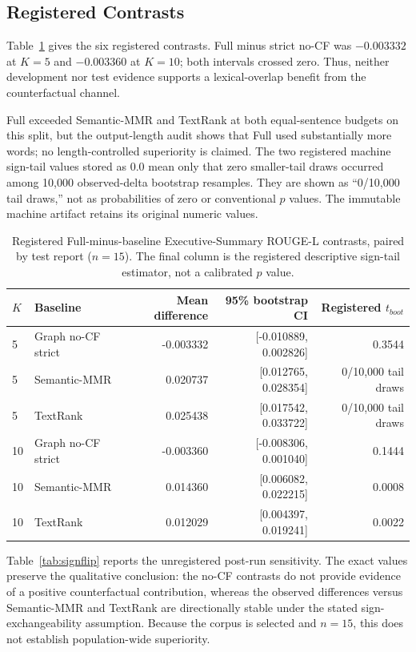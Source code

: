 \documentclass[applsci,article,submit,moreauthors]{Definitions/mdpi}
\begin{document}
\subsection{Registered Contrasts}

Table~\ref{tab:contrasts} gives the six registered contrasts. Full minus strict no-CF was $-0.003332$ at $K=5$ and $-0.003360$ at $K=10$; both intervals crossed zero. Thus, neither development nor test evidence supports a lexical-overlap benefit from the counterfactual channel.

Full exceeded Semantic-MMR and TextRank at both equal-sentence budgets on this split, but the output-length audit shows that Full used substantially more words; no length-controlled superiority is claimed. The two registered machine sign-tail values stored as 0.0 mean only that zero smaller-tail draws occurred among 10,000 observed-delta bootstrap resamples. They are shown as ``0/10,000 tail draws,'' not as probabilities of zero or conventional $p$ values. The immutable machine artifact retains its original numeric values.

\begin{table}[H]
\caption{Registered Full-minus-baseline Executive-Summary ROUGE-L contrasts, paired by test report ($n=15$). The final column is the registered descriptive sign-tail estimator, not a calibrated $p$ value.}
\label{tab:contrasts}\centering\small
\begin{tabular}{llrrr}
\toprule
$K$ & Baseline & Mean difference & 95\% bootstrap CI & Registered $t_{boot}$\\
\midrule
5 & Graph no-CF strict & -0.003332 & [-0.010889, 0.002826] & 0.3544\\
5 & Semantic-MMR & 0.020737 & [0.012765, 0.028354] & 0/10,000 tail draws\\
5 & TextRank & 0.025438 & [0.017542, 0.033722] & 0/10,000 tail draws\\
10 & Graph no-CF strict & -0.003360 & [-0.008306, 0.001040] & 0.1444\\
10 & Semantic-MMR & 0.014360 & [0.006082, 0.022215] & 0.0008\\
10 & TextRank & 0.012029 & [0.004397, 0.019241] & 0.0022\\
\bottomrule
\end{tabular}
\end{table}

Table~\ref{tab:signflip} reports the unregistered post-run sensitivity. The exact values preserve the qualitative conclusion: the no-CF contrasts do not provide evidence of a positive counterfactual contribution, whereas the observed differences versus Semantic-MMR and TextRank are directionally stable under the stated sign-exchangeability assumption. Because the corpus is selected and $n=15$, this does not establish population-wide superiority.
\end{document}
